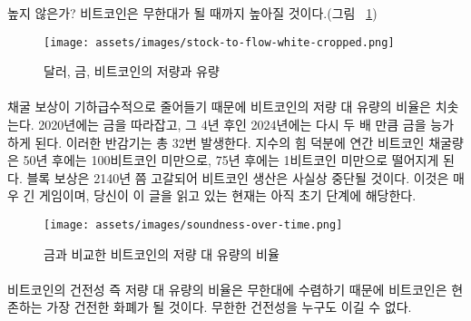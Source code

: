 \begin{comment}	
	How high? Well, it turns out that Bitcoin will get infinitely hard (see
	Figure~\ref{fig:stock-to-flow-white-cropped}).
\end{comment}
높지 않은가? 비트코인은 무한대가 될 때까지 높아질 것이다.(그림 ~\ref{fig:stock-to-flow-white-cropped})

\begin{figure}
	\texttt{[image: assets/images/stock-to-flow-white-cropped.png]}
	\caption{달러, 금, 비트코인의 저량과 유량}
	\label{fig:stock-to-flow-white-cropped}
\end{figure}

\paragraph{}
\begin{comment}	
	Due to an exponential decrease of the mining reward, the flow of new
	bitcoin will diminish resulting in a sky-rocketing stock-to-flow ratio.
	It will catch up to gold in 2020, only to surpass it four years later by
	doubling its soundness again. Such a doubling will occur 32 times in
	total. Thanks to the power of exponentials, the number of bitcoin mined
	per year will drop below 100 bitcoin in 50 years and below 1 bitcoin in
	75 years. The global faucet which is the block reward will dry up
	somewhere around the year 2140, effectively stopping the production of
	bitcoin. This is a long game. If you are reading this, you are still
	early.
\end{comment}
채굴 보상이 기하급수적으로 줄어들기 때문에 비트코인의 저량 대 유량의 비율은 치솟는다.
2020년에는 금을 따라잡고, 그 4년 후인 2024년에는 다시 두 배 만큼 금을 능가하게 된다.
이러한 반감기는 총 32번 발생한다.
지수의 힘 덕분에 연간 비트코인 채굴량은 50년 후에는 100비트코인 미만으로, 75년 후에는 1비트코인 미만으로 떨어지게 된다.
블록 보상은 2140년 쯤 고갈되어 비트코인 생산은 사실상 중단될 것이다. 
이것은 매우 긴 게임이며, 당신이 이 글을 읽고 있는 현재는 아직 초기 단계에 해당한다.

\begin{figure}
	\texttt{[image: assets/images/soundness-over-time.png]}
	\caption{금과 비교한 비트코인의 저량 대 유량의 비율}
	\label{fig:soundness-over-time}
\end{figure}

\paragraph{}
\begin{comment}	
	As bitcoin approaches infinite stock to flow ratio it will be the
	soundest money in existence. Infinite soundness is hard to beat.
\end{comment}
비트코인의 건전성 즉 저량 대 유량의 비율은 무한대에 수렴하기 때문에
비트코인은 현존하는 가장 건전한 화폐가 될 것이다.
무한한 건전성을 누구도 이길 수 없다.

